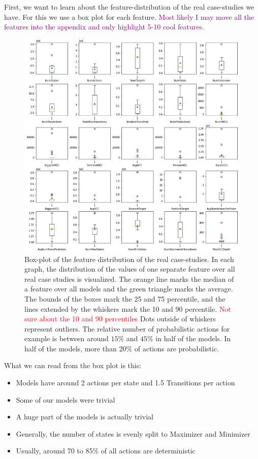 First, we want to learn about the feature-distribution of the real case-studies we have. For this we use a box plot for each feature.
\textcolor{purple}{Most likely I may move all the features into the appendix and only highlight 5-10 cool features.}
\begin{figure}[t]
    \centering
    \includegraphics[width=1\textwidth]{figures/Real_FeatureDistribution.png}
    \caption[Feature Distribution of the case-studies]{
        Box-plot of the feature distribution of the real case-studies.
        In each graph, the distribution of the values of one separate feature over all real case studies is visualized. 
        The orange line marks the median of a feature over all models and the green triangle marks the average.
        The bounds of the boxes mark the 25 and 75 percentile, and the lines extended by the whiskers mark the 10 and 90 percentile.
        \textcolor{red}{Not sure about the 10 and 90 percentiles}
        Dots outside of whiskers represent outliers.
        The relative number of probabilistic actions for example is between around $15\%$ and $45\%$ in half of the models.
        In half of the models, more than $20\%$ of actions are probabilistic.
    }
    \label{fig:Real_FeatureDistribution}
\end{figure}
What we can read from the box plot is this:
\begin{itemize}
    \item Models have around 2 actions per state and 1.5 Transitions per action
    \item Some of our models were trivial
    \item A huge part of the models is actually trivial
    \item Generally, the number of states is evenly split to Maximizer and Minimizer
    \item Usually, around 70 to 85\% of all actions are deterministic
\end{itemize}


